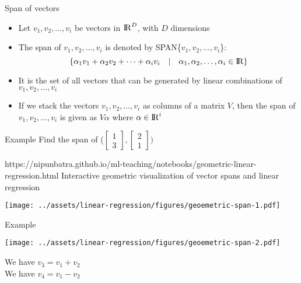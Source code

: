 \documentclass{beamer}
\begin{document}
\begin{frame}{Span of vectors}
\begin{itemize}[<+->]
    \item Let $v_{1},v_{2},\dots,v_{i}$ be vectors in  ${\rm I\!R}^{D}$, with $D$ dimensions
    \item The span of  $v_{1},v_{2},\dots,v_{i}$ is denoted by SPAN\{$v_{1},v_{2},\dots,v_{i} $\}:
        \begin{equation*}
        \{	\alpha_{1}v_{1}+			\alpha_{2}v_{2}+
        \dots+\alpha_{i}v_{i} \hspace{1em}\vert \hspace{1em}  \alpha_{1},\alpha_{2},\dots,\alpha_{i} \in {\rm I\!R}\}
        \end{equation*}
    \item It is the set of all vectors that can be generated by linear combinations of $v_{1},v_{2},\dots,v_{i}$
    \item If we stack the vectors $v_{1},v_{2},\dots,v_{i}$ as columns of a matrix $V$, then the span of $v_{1},v_{2},\dots,v_{i}$ is given as $V\alpha$ where $\alpha \in {\rm I\!R}^{i}$
\end{itemize}
\end{frame}

\begin{frame}{Example}
Find the span of ($\begin{bmatrix}
1 \\3
\end{bmatrix}, \begin{bmatrix}
2 \\1
\end{bmatrix}) $

\begin{notebookbox}{https://nipunbatra.github.io/ml-teaching/notebooks/geometric-linear-regression.html}
Interactive geometric visualization of vector spans and linear regression
\end{notebookbox}

\texttt{[image: ../assets/linear-regression/figures/geoemetric-span-1.pdf]}



\end{frame}

\begin{frame}{Example}

    \texttt{[image: ../assets/linear-regression/figures/geoemetric-span-2.pdf]}

    We have $v_3 = v_1 + v_2$ \\
    We have $v_4 = v_1 - v_2$ \\


\end{frame}
\end{document}
